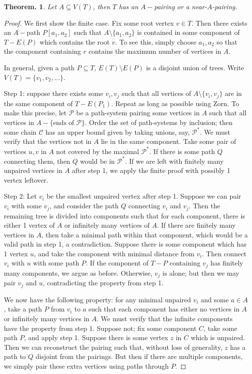\documentclass[11pt, a4paper]{memoir}
\theoremstyle{change}
\newtheorem{theorem}{Theorem.}[section]
\theoremstyle{plain}
\theoremstyle{nonumberplain}
\newtheorem{proof}{Proof}
\numberwithin{equation}{section}
\begin{document}
\begin{theorem}
    Let $A\subseteq V(T)$, then $T$ has an $A-$pairing or a near-$A$-pairing.
\end{theorem}
\begin{proof}
    We first show the finite case.
    Fix some root vertex $v\in T$.
    Then there exists an $A-$path $P[a_1,a_2]$ such that $A\setminus\{a_1,a_2\}$ is contained in some component of $T-E(P)$ which contains the root $v$.
    To see this, simply choose $a_1,a_2$ so that the component containing $r$ contains the maximum number of vertices in $A$.

    In general, given a path $P\subseteq T$, $E(T)\setminus E(P)$ is a disjoint union of trees.
    Write $V(T)=\{v_1,v_2,\ldots\}$.

    Step 1: suppose there exists some $v_i,v_j$ such that all vertices of $A\setminus\{v_i,v_j\}$ are in the same component of $T-E(P_1)$.
    Repeat as long as possible using Zorn.
    To make this precise, let $\mathcal{P}$ be a path-system pairing some vertices in $A$ such that all vertices in $A-\{\text{ends of }\mathcal{P}\}$.
    Order the set of path-systems by inclusion; then some chain $\mathcal{C}$ has an upper bound given by taking unions, say, $\mathcal{P}^*$.
    We must verify that the vertices not in $A$ lie in the same component.
    Take some pair of vertices $u,v$ in $A$ not covered by the maximal $\mathcal{P}^*$.
    If there is some path $Q$ connecting them, then $Q$ would be in $\mathcal{P}^*$.
    If we are left with finitely many unpaired vertices in $A$ after step 1, we apply the finite proof with possibly 1 vertex leftover.

    Step 2: Let $v_i$ be the smallest unpaired vertex after step 1.
    Suppose we can pair $v_i$ with some $v_j$, and consider the path $Q$ connecting $v_i$ and $v_j$.
    Then the remaining tree is divided into components such that for each component, there is either 1 vertex of $A$ or infinitely many vertices of $A$.
    If there are finitely many vertices in $A$, then take a minimal path within that component, which would be a valid path in step 1, a contradiction.
    Suppose there is some component which has 1 vertex $u$, and take the component with minimal distance from $v_i$.
    Then connect $v_i$ with $u$ with some path $P$.
    If the component of $T-P$ containing $v_j$ has finitely many components, we argue as before.
    Otherwise, $v_j$ is alone; but then we may pair $v_j$ and $u$, contradicting the property from step 1.

    We now have the following property: for any minimal unpaired $v_i$ and some $a\in A$, take a path $P$ from $v_i$ to $a$ such that each component has either no vertices in $A$ or infinitely many vertices in $A$.
    We must verify that the infinite components have the property from step 1.
    Suppose not; fix some component $C$, take some path $P$, and apply step 1.
    Suppose there is some vertex $z$ in $C$ which is unpaired.
    Then we can reconstruct the pairing such that, without loss of generality, $z$ has a path to $Q$ disjoint from the pairings.
    But then if there are multiple components, we simply pair these extra vertices using paths through $P$.
\end{proof}
\end{document}

